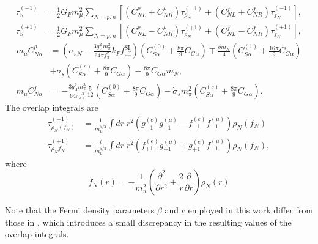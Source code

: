\documentclass{book}[letterpaper,12pt]
\begin{document}
\begin{equation}
\begin{split}
\tau_S^{(-1)}&=\frac{1}{2}G_Fm_{\mu}^2\sum_{N=p,n}\left[\left(C^{\rho}_{NL}+C^{\rho}_{NR}\right)\tau^{(-1)}_{\rho_N}+\left(C^f_{NL}+C^f_{NR}\right)\tau^{(-1)}_{f_N}\right],\\
\tau_S^{(+1)}&=\frac{1}{2}G_Fm_{\mu}^2\sum_{N=p,n}\left[\left(C_{NL}^{\rho}-C_{NR}^{\rho}\right)\tau_{\rho_N}^{(+1)}+\left(C_{NL}^f-C_{NR}^f\right)\tau_{f_N}^{(+1)}\right],
\end{split}
\end{equation}
\begin{equation}
\begin{split}
m_{\mu}C_{N\alpha}^{\rho}&=\left(\sigma_{\pi N}-\frac{3g_A^2m_{\pi}^2}{64\pi f_{\pi}^2}k_Ff^\mathrm{SI}_\mathrm{eff}\right)\left(C_{S\alpha}^{(0)}+\frac{8\pi}{9}C_{G\alpha}\right)\mp\frac{\delta m_N}{4}\left(C_{S\alpha}^{(1)}+\frac{16\pi}{9}C_{G\alpha}\right)\\
&+\sigma_s\left(C_{S\alpha}^{(s)}+\frac{8\pi}{9}C_{G\alpha}\right)-\frac{8\pi}{9}C_{G\alpha}m_N,\\
m_{\mu}C_{N\alpha}^f&=-\frac{3g_A^2m_{\pi}^3}{64\pi f_{\pi}^2}\frac{5}{12}\left(C_{S\alpha}^{(0)}+\frac{8\pi}{9}C_{G\alpha}\right)-\dot{\sigma}_sm_{\pi}^2\left(C_{S\alpha}^{(s)}+\frac{8\pi}{9}C_{G\alpha}\right).
\end{split}
\end{equation}
The overlap integrals are
\begin{equation}
\begin{split}
\tau^{(-1)}_{\rho_N(f_N)}&=\frac{1}{m_{\mu}^{5/2}}\int dr\;r^2\left(g^{(e)}_{-1}g^{(\mu)}_{-1}-f_{-1}^{(e)}f_{-1}^{(\mu)}\right)\rho_N(f_N)\\
\tau^{(+1)}_{\rho_Nf_N}&=\frac{i}{m_{\mu}^{5/2}}\int dr\;r^2\left(f_{+1}^{(e)}g_{-1}^{(\mu)}+g_{+1}^{(e)}f_{-1}^{(\mu)}\right)\rho_N(f_N),
\end{split}
\end{equation}
where
\begin{equation}
f_N(r)=-\frac{1}{m_{\pi}^2}\left(\frac{\partial^2}{\partial r^2}+\frac{2}{r}\frac{\partial}{\partial r}\right)\rho_N(r)
\end{equation}

Note that the Fermi density parameters $\beta$ and $c$ employed in this work differ from those in \cite{Cirigliano:2022ekw}, which introduces a small discrepancy in the resulting values of the overlap integrals.
\end{document}
